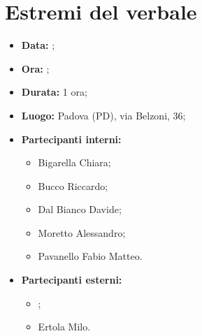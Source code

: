 \section{Estremi del verbale}
\begin{itemize}
	\item \textbf{Data:} ;
	\item \textbf{Ora:} ;
	\item \textbf{Durata:} 1 ora;
	\item \textbf{Luogo:} Padova (PD), via Belzoni, 36;
	\item \textbf{Partecipanti interni:}
	\begin{itemize}
		\item Bigarella Chiara;
		\item Bucco Riccardo;
		\item Dal Bianco Davide;
		\item Moretto Alessandro;
		\item Pavanello Fabio Matteo.
	\end{itemize}
	\item \textbf{Partecipanti esterni:}
	\begin{itemize}
		\item \proponente;
		\item Ertola Milo.
	\end{itemize}
\end{itemize}
\newpage
